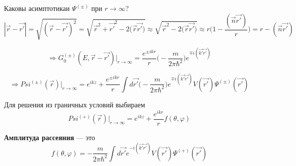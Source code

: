 Каковы асимптотикаи $\Psi^{(\pm)}$ при $r \longrightarrow \infty$?
\[
|\vec{r} - \vec{r'}| = \sqrt{(\vec{r} - \vec{r'})^2} = \sqrt{\vec{r}^2 + \vec{r'}^2 - 2({\vec{r}\vec{r'})}} \approx \sqrt{\vec{r}^2 - 2({\vec{r}\vec{r'})}} \approx r\Big( 1 - \frac{(\vec{n}\vec{r'})}{r}\Big) = r - (\vec{n}\vec{r'})
\]

\[
\Longrightarrow G_0^{(\pm)}(E, \vec{r} - \vec{r'})\Big|_{r\longrightarrow\infty} = \dfrac{e^{\pm ikr}}{r}\Big(- \dfrac{m}{2\pi\hbar^2}\Big)e^{\mp i(\vec{k'}\vec{r'})}
\]

\[
\Longrightarrow Psi^{(\pm)}(\vec{r})\Big|_{r\longrightarrow\infty} = e^{ikz} + \dfrac{e^{\pm ikr}}{r}\int d\vec{r'}\Big(- \dfrac{m}{2\pi\hbar^2}\Big)e^{\mp i(\vec{k'}\vec{r'})}V(\vec{r'})\Psi^{(\pm)}(\vec{r'})
\]

Для решения из граничных условий выбираем
\[
Psi^{(+)}(\vec{r})\Big|_{r\longrightarrow\infty} = e^{ikz} + \dfrac{e^{ikr}}{r}f(\theta, \varphi)
\]

\begin{definition}
	\textbf{Амплитуда рассеяния} --- это
	\[
		f(\theta, \varphi) = - \dfrac{m}{2\pi\hbar^2}\int d\vec{r'} e^{-i(\vec{k'}\vec{r'})}V(\vec{r'})\Psi^{(+)}(\vec{r'})
	\]
\end{definition}

